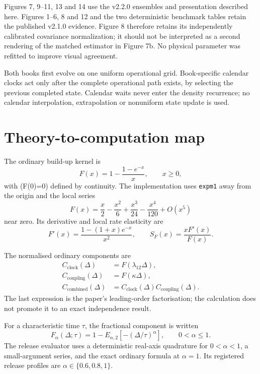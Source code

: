 \documentclass[11pt]{article}
\begin{document}
Figures 7, 9--11, 13 and 14 use the v2.2.0 ensembles and presentation described here. Figures 1--6, 8 and 12 and the two deterministic benchmark tables retain the published v2.1.0 evidence. Figure 8 therefore retains its independently calibrated covariance normalization; it should not be interpreted as a second rendering of the matched estimator in Figure 7b. No physical parameter was refitted to improve visual agreement.

Both books first evolve on one uniform operational grid. Book-specific calendar clocks act only after the complete operational path exists, by selecting the previous completed state. Calendar waits never enter the density recurrence; no calendar interpolation, extrapolation or nonuniform state update is used.

\section{Theory-to-computation map}

The ordinary build-up kernel is
\begin{equation}
F(x)=1-\frac{1-e^{-x}}{x},\qquad x\geq0,
\label{eq:ordinary}
\end{equation}
with (F(0)=0) defined by continuity. The implementation uses \texttt{expm1} away from the origin and the local series
\begin{equation}
F(x)=\frac{x}{2}-\frac{x^2}{6}+\frac{x^3}{24}-\frac{x^4}{120}+O(x^5)
\end{equation}
near zero. Its derivative and local rate elasticity are
\begin{equation}
F'(x)=\frac{1-(1+x)e^{-x}}{x^2},
\qquad
S_F(x)=\frac{xF'(x)}{F(x)}.
\label{eq:elasticity}
\end{equation}

The normalised ordinary components are
\begin{align}
C_{\mathrm{clock}}(\Delta)&=F(\lambda_{12}\Delta),\\
C_{\mathrm{coupling}}(\Delta)&=F(\kappa\Delta),\\
C_{\mathrm{combined}}(\Delta)&=C_{\mathrm{clock}}(\Delta)C_{\mathrm{coupling}}(\Delta).
\end{align}
The last expression is the paper's leading-order factorisation; the calculation does not promote it to an exact independence result.

For a characteristic time \(\tau\), the fractional component is written
\begin{equation}
F_\alpha(\Delta;\tau)
=1-E_{\alpha,2}\!\left[-(\Delta/\tau)^\alpha\right],
\qquad 0<\alpha\leq1.
\label{eq:fractional}
\end{equation}
The release evaluator uses a deterministic real-axis quadrature for \(0<\alpha<1\), a small-argument series, and the exact ordinary formula at \(\alpha=1\). Its registered release profiles are \(\alpha\in\{0.6,0.8,1\}\).
\end{document}
